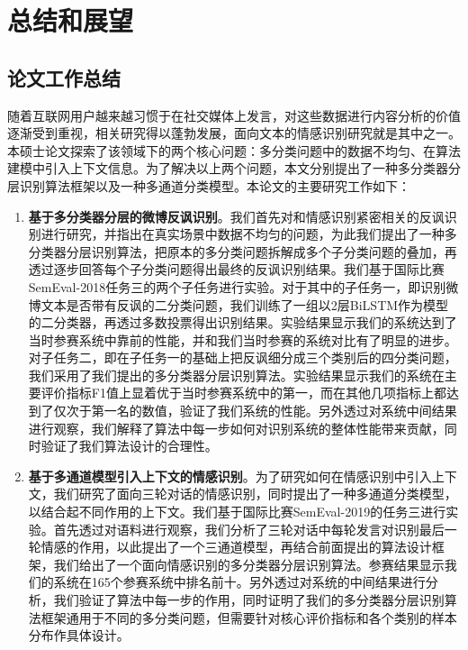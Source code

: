 \chapter{总结和展望}
\label{cha:conclusion}

\section{论文工作总结}

随着互联网用户越来越习惯于在社交媒体上发言，对这些数据进行内容分析的价值逐渐受到重视，相关研究得以蓬勃发展，面向文本的情感识别研究就是其中之一。本硕士论文探索了该领域下的两个核心问题：多分类问题中的数据不均匀、在算法建模中引入上下文信息。为了解决以上两个问题，本文分别提出了一种多分类器分层识别算法框架以及一种多通道分类模型。本论文的主要研究工作如下：

\begin{enumerate}

\item {\bf 基于多分类器分层的微博反讽识别}。我们首先对和情感识别紧密相关的反讽识别进行研究，并指出在真实场景中数据不均匀的问题，为此我们提出了一种多分类器分层识别算法，把原本的多分类问题拆解成多个子分类问题的叠加，再透过逐步回答每个子分类问题得出最终的反讽识别结果。我们基于国际比赛SemEval-2018任务三的两个子任务进行实验。对于其中的子任务一，即识别微博文本是否带有反讽的二分类问题，我们训练了一组以2层BiLSTM作为模型的二分类器，再透过多数投票得出识别结果。实验结果显示我们的系统达到了当时参赛系统中靠前的性能，并和我们当时参赛的系统对比有了明显的进步。对子任务二，即在子任务一的基础上把反讽细分成三个类别后的四分类问题，我们采用了我们提出的多分类器分层识别算法。实验结果显示我们的系统在主要评价指标F1值上显着优于当时参赛系统中的第一，而在其他几项指标上都达到了仅次于第一名的数值，验证了我们系统的性能。另外透过对系统中间结果进行观察，我们解释了算法中每一步如何对识别系统的整体性能带来贡献，同时验证了我们算法设计的合理性。

\item {\bf 基于多通道模型引入上下文的情感识别}。为了研究如何在情感识别中引入上下文，我们研究了面向三轮对话的情感识别，同时提出了一种多通道分类模型，以结合起不同作用的上下文。我们基于国际比赛SemEval-2019的任务三进行实验。首先透过对语料进行观察，我们分析了三轮对话中每轮发言对识别最后一轮情感的作用，以此提出了一个三通道模型，再结合前面提出的算法设计框架，我们给出了一个面向情感识别的多分类器分层识别算法。参赛结果显示我们的系统在165个参赛系统中排名前十。另外透过对系统的中间结果进行分析，我们验证了算法中每一步的作用，同时证明了我们的多分类器分层识别算法框架通用于不同的多分类问题，但需要针对核心评价指标和各个类别的样本分布作具体设计。

\end{enumerate}

